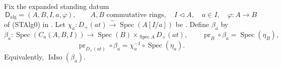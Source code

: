 \begin{lemma}
  \label{lemma:nagata-strict-transform-basechange-chart}
  \lean{}

  Fix the expanded standing datum
  \[
    \mathsf D_{\mathrm{alg}}=(A,B,I,a,\varphi),\qquad
    A,B\text{ commutative rings},\quad
    I\triangleleft A,\quad a\in I,\quad
    \varphi\colon A\to B
  \]
  of (STAlg0) in
  .
  Let $\chi_a\colon D_+(at)\xrightarrow{\sim}
  \operatorname{Spec}(A[I/a])$ be
  .  Define $\beta_a$ by
  \[
    \beta_a\colon\operatorname{Spec}(C_a(A,B,I))
      \longrightarrow
      \operatorname{Spec}(B)\times_{\operatorname{Spec}A}D_+(at),
    \qquad
    \operatorname{pr}_B\circ\beta_a=\operatorname{Spec}(\eta_B),
  \]
  \[
    \operatorname{pr}_{D_+(at)}\circ\beta_a
      =\chi_a^{-1}\circ\operatorname{Spec}(\eta_a).
  \]
  Equivalently, $\operatorname{IsIso}(\beta_a)$.
\end{lemma}

